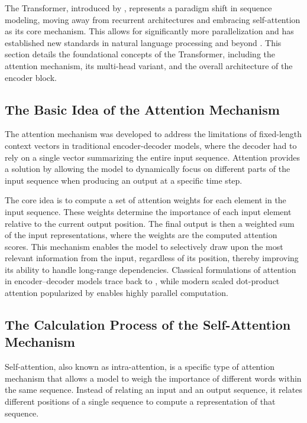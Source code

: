 The Transformer, introduced by \cite{vaswani2017attention}, represents a paradigm shift in sequence modeling, moving away from recurrent architectures and embracing self-attention as its core mechanism. This allows for significantly more parallelization and has established new standards in natural language processing and beyond \citep{zhou2021informer, zhao2019deep}. This section details the foundational concepts of the Transformer, including the attention mechanism, its multi-head variant, and the overall architecture of the encoder block.

\subsection{The Basic Idea of the Attention Mechanism}
The attention mechanism was developed to address the limitations of fixed-length context vectors in traditional encoder-decoder models, where the decoder had to rely on a single vector summarizing the entire input sequence. Attention provides a solution by allowing the model to dynamically focus on different parts of the input sequence when producing an output at a specific time step.

The core idea is to compute a set of attention weights for each element in the input sequence. These weights determine the importance of each input element relative to the current output position. The final output is then a weighted sum of the input representations, where the weights are the computed attention scores. This mechanism enables the model to selectively draw upon the most relevant information from the input, regardless of its position, thereby improving its ability to handle long-range dependencies.
Classical formulations of attention in encoder–decoder models trace back to \cite{bahdanau2015neural}, while modern scaled dot-product attention popularized by \cite{vaswani2017attention} enables highly parallel computation.

\subsection{The Calculation Process of the Self-Attention Mechanism}
Self-attention, also known as intra-attention, is a specific type of attention mechanism that allows a model to weigh the importance of different words within the same sequence. Instead of relating an input and an output sequence, it relates different positions of a single sequence to compute a representation of that sequence.


